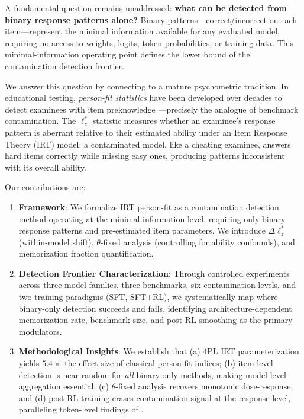 \documentclass[11pt,a4paper]{article}
\begin{document}
A fundamental question remains unaddressed: \textbf{what can be detected from binary response patterns alone?}
Binary patterns---correct/incorrect on each item---represent the minimal information available for any evaluated model, requiring no access to weights, logits, token probabilities, or training data.
This minimal-information operating point defines the lower bound of the contamination detection frontier.

We answer this question by connecting to a mature psychometric tradition.
In educational testing, \emph{person-fit statistics} have been developed over decades to detect examinees with item preknowledge \citep{meijer1996personfit, snijders2001}---precisely the analogue of benchmark contamination.
The $\ell_{z}^{*}$ statistic \citep{snijders2001} measures whether an examinee's response pattern is aberrant relative to their estimated ability under an Item Response Theory (IRT) model: a contaminated model, like a cheating examinee, answers hard items correctly while missing easy ones, producing patterns inconsistent with its overall ability.

Our contributions are:

\begin{enumerate}
    \item \textbf{Framework}: We formalize IRT person-fit as a contamination detection method operating at the minimal-information level, requiring only binary response patterns and pre-estimated item parameters. We introduce $\Delta\ell_{z}^{*}$ (within-model shift), $\theta$-fixed analysis (controlling for ability confounds), and memorization fraction quantification.

    \item \textbf{Detection Frontier Characterization}: Through controlled experiments across three model families, three benchmarks, six contamination levels, and two training paradigms (SFT, SFT+RL), we systematically map where binary-only detection succeeds and fails, identifying architecture-dependent memorization rate, benchmark size, and post-RL smoothing as the primary modulators.

    \item \textbf{Methodological Insights}: We establish that (a) 4PL IRT parameterization yields $5.4\times$ the effect size of classical person-fit indices; (b) item-level detection is near-random for \emph{all} binary-only methods, making model-level aggregation essential; (c) $\theta$-fixed analysis recovers monotonic dose-response; and (d) post-RL training erases contamination signal at the response level, paralleling token-level findings of \citet{wang2025rlmia}.
\end{enumerate}
\end{document}

